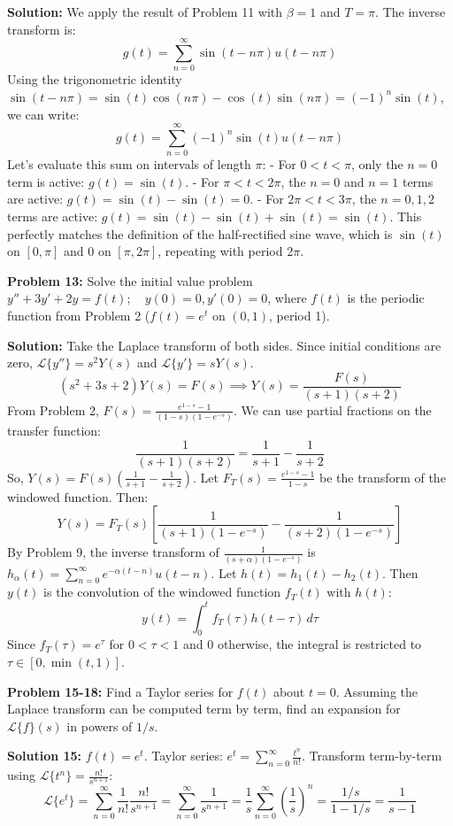 \documentclass[11pt, letterpaper]{article}
\theoremstyle{definition}
\theoremstyle{remark}
\begin{document}
\textbf{Solution:}
We apply the result of Problem 11 with $\beta = 1$ and $T = \pi$. The inverse transform is:
\[ g(t) = \sum_{n=0}^\infty \sin(t-n\pi) u(t-n\pi) \]
Using the trigonometric identity $\sin(t-n\pi) = \sin(t)\cos(n\pi) - \cos(t)\sin(n\pi) = (-1)^n \sin(t)$, we can write:
\[ g(t) = \sum_{n=0}^\infty (-1)^n \sin(t) u(t-n\pi) \]
Let's evaluate this sum on intervals of length $\pi$:
- For $0 < t < \pi$, only the $n=0$ term is active: $g(t) = \sin(t)$.
- For $\pi < t < 2\pi$, the $n=0$ and $n=1$ terms are active: $g(t) = \sin(t) - \sin(t) = 0$.
- For $2\pi < t < 3\pi$, the $n=0, 1, 2$ terms are active: $g(t) = \sin(t) - \sin(t) + \sin(t) = \sin(t)$.
This perfectly matches the definition of the half-rectified sine wave, which is $\sin(t)$ on $[0, \pi]$ and $0$ on $[\pi, 2\pi]$, repeating with period $2\pi$.

\vspace{1em}
\textbf{Problem 13:} Solve the initial value problem $y'' + 3y' + 2y = f(t); \quad y(0)=0, y'(0)=0$, where $f(t)$ is the periodic function from Problem 2 ($f(t)=e^t$ on $(0,1)$, period 1).

\textbf{Solution:}
Take the Laplace transform of both sides. Since initial conditions are zero, $\mathcal{L}\{y''\} = s^2 Y(s)$ and $\mathcal{L}\{y'\} = s Y(s)$.
\[ (s^2 + 3s + 2) Y(s) = F(s) \implies Y(s) = \frac{F(s)}{(s+1)(s+2)} \]
From Problem 2, $F(s) = \frac{e^{1-s}-1}{(1-s)(1-e^{-s})}$.
We can use partial fractions on the transfer function:
\[ \frac{1}{(s+1)(s+2)} = \frac{1}{s+1} - \frac{1}{s+2} \]
So, $Y(s) = F(s) \left( \frac{1}{s+1} - \frac{1}{s+2} \right)$.
Let $F_T(s) = \frac{e^{1-s}-1}{1-s}$ be the transform of the windowed function. Then:
\[ Y(s) = F_T(s) \left[ \frac{1}{(s+1)(1-e^{-s})} - \frac{1}{(s+2)(1-e^{-s})} \right] \]
By Problem 9, the inverse transform of $\frac{1}{(s+\alpha)(1-e^{-s})}$ is $h_\alpha(t) = \sum_{n=0}^\infty e^{-\alpha(t-n)} u(t-n)$.
Let $h(t) = h_1(t) - h_2(t)$. Then $y(t)$ is the convolution of the windowed function $f_T(t)$ with $h(t)$:
\[ y(t) = \int_0^t f_T(\tau) h(t-\tau) \, d\tau \]
Since $f_T(\tau) = e^\tau$ for $0 < \tau < 1$ and $0$ otherwise, the integral is restricted to $\tau \in [0, \min(t, 1)]$.

\vspace{1em}
\textbf{Problem 15-18:} Find a Taylor series for $f(t)$ about $t=0$. Assuming the Laplace transform can be computed term by term, find an expansion for $\mathcal{L}\{f\}(s)$ in powers of $1/s$.

\textbf{Solution 15:} $f(t) = e^t$.
Taylor series: $e^t = \sum_{n=0}^\infty \frac{t^n}{n!}$.
Transform term-by-term using $\mathcal{L}\{t^n\} = \frac{n!}{s^{n+1}}$:
\[ \mathcal{L}\{e^t\} = \sum_{n=0}^\infty \frac{1}{n!} \frac{n!}{s^{n+1}} = \sum_{n=0}^\infty \frac{1}{s^{n+1}} = \frac{1}{s} \sum_{n=0}^\infty \left(\frac{1}{s}\right)^n = \frac{1/s}{1 - 1/s} = \frac{1}{s-1} \]
\end{document}
